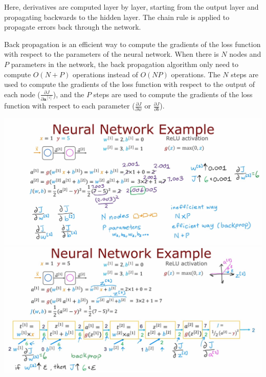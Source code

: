 Here, derivatives are computed layer by layer, starting from the output layer and propagating backwards to the hidden layer. The chain rule is applied to propagate errors back through the network.
\par
\vspace{2em}
Back propagation is an efficient way to compute the gradients of the loss function with respect to the parameters of the neural network.
When there is $N$ nodes and $P$ parameters in the network, the back propagation algorithm only need to compute $O(N + P)$ operations instead of $O(NP)$ operations.
The $N$ steps are used to compute the gradients of the loss function with respect to the output of each node ($\frac{\partial J}{\partial \mathbf{a}^{[i]}}$),
 and the $P$ steps are used to compute the gradients of the loss function with respect to each parameter ($\frac{\partial J}{\partial w} $ or $\frac{\partial J}{\partial b}$).
\par
\noindent
\includegraphics*[width=\textwidth]{images/9.6}
\includegraphics*[width=\textwidth]{images/9.7}